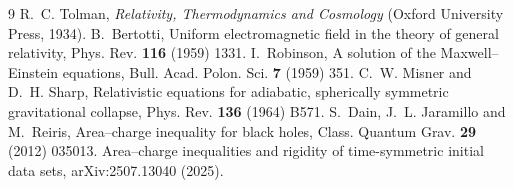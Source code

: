 \begin{thebibliography}{9}
 R.~C. Tolman, \emph{Relativity, Thermodynamics and Cosmology} (Oxford University Press, 1934).
 B.~Bertotti, Uniform electromagnetic field in the theory of general relativity, Phys. Rev. \textbf{116} (1959) 1331.
 I.~Robinson, A solution of the Maxwell--Einstein equations, Bull. Acad. Polon. Sci. \textbf{7} (1959) 351.
 C.~W. Misner and D.~H. Sharp, Relativistic equations for adiabatic, spherically symmetric gravitational collapse, Phys. Rev. \textbf{136} (1964) B571.
 S.~Dain, J.~L. Jaramillo and M.~Reiris, Area--charge inequality for black holes, Class. Quantum Grav. \textbf{29} (2012) 035013.
 Area--charge inequalities and rigidity of time-symmetric initial data sets, arXiv:2507.13040 (2025).
\end{thebibliography}
